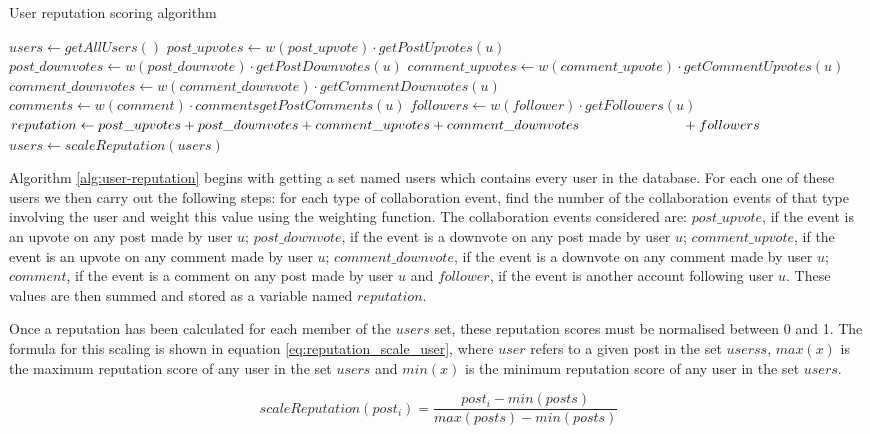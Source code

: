 \newcommand{\myindent}[1]{
\newline\makebox[#1cm]{}
}

\begin{algorithm}[H]
\caption{User reputation scoring algorithm}
\label{alg:user-reputation}
\begin{algorithmic}[1]
\State $users\gets getAllUsers()$
	\State $post\_upvotes\gets w(post\_upvote)\cdot getPostUpvotes(u)$
	\State $post\_downvotes\gets w(post\_downvote)\cdot getPostDownvotes(u)$
	\State $comment\_upvotes\gets w(comment\_upvote)\cdot getCommentUpvotes(u)$
	\State $comment\_downvotes\gets w(comment\_downvote)\cdot getCommentDownvotes(u)$
	\State $comments\gets w(comment)\cdot commentsgetPostComments(u)$
	\State $followers\gets w(follower)\cdot getFollowers(u)$
	\State $reputation\gets post\_upvotes + post\_downvotes + comment\_upvotes + comment\_downvotes \myindent{2.6} + followers$
\EndFor
\State $users\gets scaleReputation(users)$
\end{algorithmic}
\end{algorithm}

\noindent
Algorithm \ref{alg:user-reputation} begins with getting a set named users which contains every user in the database. For each one of these users we then carry out the following steps: for each type of collaboration event, find the number of the collaboration events of that type involving the user and weight this value using the weighting function. The collaboration events considered are: \(post\_upvote\), if the event is an upvote on any post made by user \(u\); \(post\_downvote\), if the event is a downvote on any post made by user \(u\); \(comment\_upvote\), if the event is an upvote on any comment made by user \(u\); \(comment\_downvote\), if the event is a downvote on any comment made by user \(u\); \(comment\), if the event is a comment on any post made by user \(u\) and \(follower\), if the event is another account following user \(u\). These values are then summed and stored as a variable named \(reputation\).

Once a reputation has been calculated for each member of the \(users\) set, these reputation scores must be normalised between 0 and 1. The formula for this scaling is shown in equation \ref{eq:reputation_scale_user}, where \(user\) refers to a given post in the set \(userss\), \(max(x)\) is the maximum reputation score of any user in the set \(users\) and \(min(x)\) is the minimum reputation score of any user in the set \(users\).

\begin{equation}
	\label{eq:reputation_scale}
	scaleReputation(post_i) = \frac{post_i - min(posts)}{max(posts) - min(posts)}
\end{equation}
